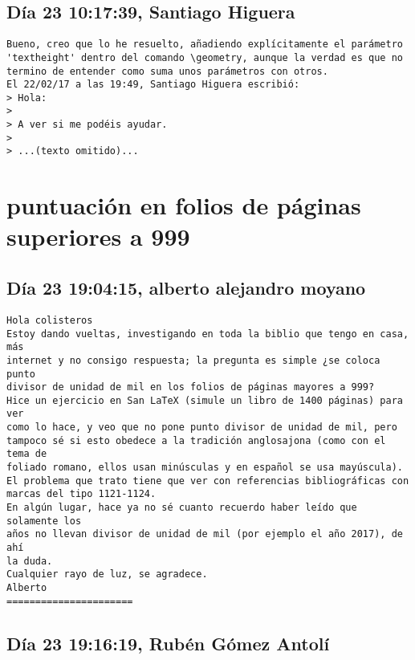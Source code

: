 \documentclass[a4paper,10pt]{article}
\begin{document}
\subsection{Día 23 10:17:39, Santiago Higuera}

\begin{lstlisting}
Bueno, creo que lo he resuelto, añadiendo explícitamente el parámetro 
'textheight' dentro del comando \geometry, aunque la verdad es que no 
termino de entender como suma unos parámetros con otros.
El 22/02/17 a las 19:49, Santiago Higuera escribió:
> Hola:
>
> A ver si me podéis ayudar.
>
> ...(texto omitido)...

\end{lstlisting}
\section{puntuación en folios de páginas superiores a 999}

\subsection{Día 23 19:04:15, alberto alejandro moyano}

\begin{lstlisting}
Hola colisteros
Estoy dando vueltas, investigando en toda la biblio que tengo en casa, más
internet y no consigo respuesta; la pregunta es simple ¿se coloca punto
divisor de unidad de mil en los folios de páginas mayores a 999?
Hice un ejercicio en San LaTeX (simule un libro de 1400 páginas) para ver
como lo hace, y veo que no pone punto divisor de unidad de mil, pero
tampoco sé si esto obedece a la tradición anglosajona (como con el tema de
foliado romano, ellos usan minúsculas y en español se usa mayúscula).
El problema que trato tiene que ver con referencias bibliográficas con
marcas del tipo 1121-1124.
En algún lugar, hace ya no sé cuanto recuerdo haber leído que solamente los
años no llevan divisor de unidad de mil (por ejemplo el año 2017), de ahí
la duda.
Cualquier rayo de luz, se agradece.
Alberto
======================

\end{lstlisting}

\subsection{Día 23 19:16:19, Rubén Gómez Antolí}
\end{document}
